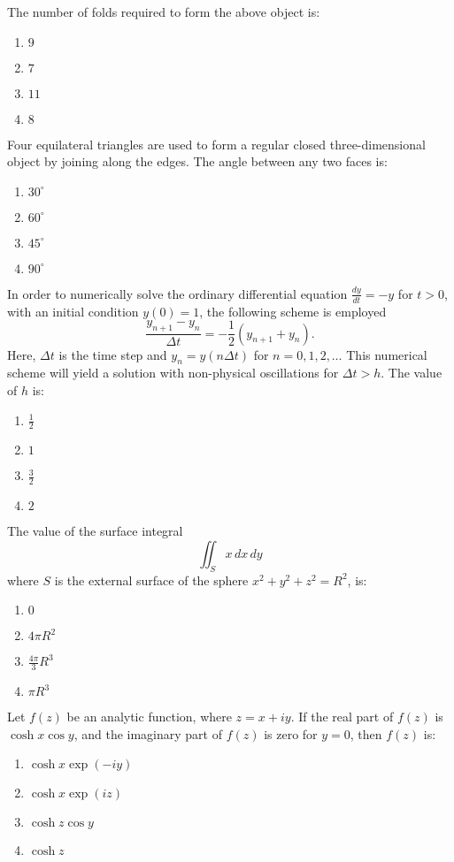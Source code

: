 The number of folds required to form the above object is:
\begin{enumerate}
        \item $9$
        \item $7$
        \item $11$
        \item $8$
    \end{enumerate}

    \item Four equilateral triangles are used to form a regular closed three-dimensional object by joining along the edges. The angle between any two faces is:
    \begin{enumerate}
        \item $30^\circ$
        \item $60^\circ$
        \item $45^\circ$
        \item $90^\circ$
    \end{enumerate}
 \item In order to numerically solve the ordinary differential equation $\frac{dy}{dt} = -y$ for $t > 0$, with an initial condition $y(0) = 1$, the following scheme is employed
    \[
    \frac{y_{n+1} - y_n}{\Delta t} = -\frac{1}{2} (y_{n+1} + y_n).
    \]
    Here, $\Delta t$ is the time step and $y_n = y(n\Delta t)$ for $n = 0, 1, 2, \dots$ This numerical scheme will yield a solution with non-physical oscillations for $\Delta t > h$. The value of $h$ is:
    \begin{enumerate}
        \item $\frac{1}{2}$
        \item $1$
        \item $\frac{3}{2}$
        \item $2$
    \end{enumerate}

    \item The value of the surface integral
    \[
    \iint_S x \, dx \, dy
    \]
    where $S$ is the external surface of the sphere $x^2 + y^2 + z^2 = R^2$, is:
    \begin{enumerate}
        \item $0$
        \item $4 \pi R^2$
        \item $\frac{4 \pi}{3} R^3$
        \item $\pi R^3$
    \end{enumerate}

    \item Let $f(z)$ be an analytic function, where $z = x + i y$. If the real part of $f(z)$ is $\cosh x \cos y$, and the imaginary part of $f(z)$ is zero for $y = 0$, then $f(z)$ is:
    \begin{enumerate}
        \item $\cosh x \exp(-i y)$
        \item $\cosh x \exp(i z)$
        \item $\cosh z \cos y$
        \item $\cosh z$
    \end{enumerate}
    



